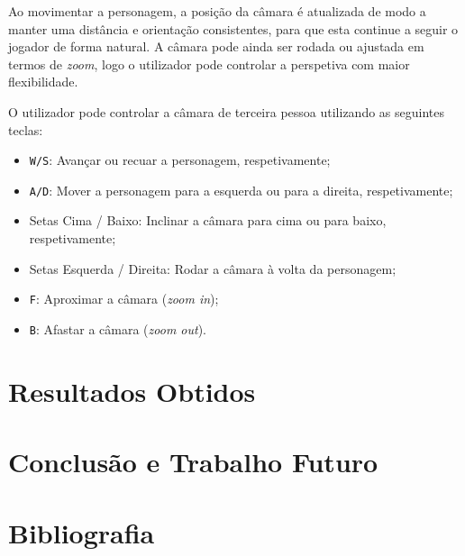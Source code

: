 \documentclass[12pt, a4paper]{article}
\begin{document}
Ao movimentar a personagem, a posição da câmara é atualizada de modo a manter uma distância e
orientação consistentes, para que esta continue a seguir o jogador de forma natural. A câmara
pode ainda ser rodada ou ajustada em termos de \textit{zoom}, logo o utilizador pode controlar a
perspetiva com maior flexibilidade.

O utilizador pode controlar a câmara de terceira pessoa utilizando as seguintes teclas:

\begin{itemize}
    \item \texttt{W/S}: Avançar ou recuar a personagem, respetivamente;
    \item \texttt{A/D}: Mover a personagem para a esquerda ou para a direita, respetivamente;
    \item Setas Cima / Baixo: Inclinar a câmara para cima ou para baixo, respetivamente;
    \item Setas Esquerda / Direita: Rodar a câmara à volta da personagem;
    \item \texttt{F}: Aproximar a câmara (\textit{zoom in});
    \item \texttt{B}: Afastar a câmara (\textit{zoom out}).
\end{itemize}

\section{Resultados Obtidos}

\section{Conclusão e Trabalho Futuro}

\begingroup
\section{Bibliografia}
\renewcommand{\section}[2]{}
\end{document}

